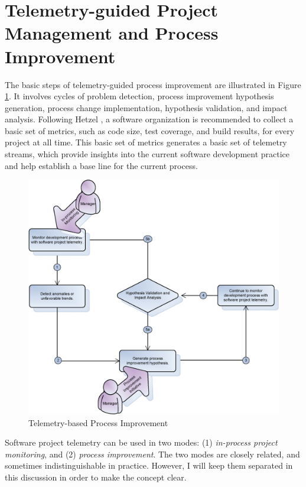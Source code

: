 \section{Telemetry-guided Project Management and Process Improvement} 
\label{Telemetry:Process}

The basic steps of telemetry-guided process improvement are illustrated in Figure \ref{fig:TelemetryBasedProcessImprovement}. It involves cycles of problem detection, process improvement hypothesis generation, process change implementation, hypothesis validation, and impact analysis.
Following Hetzel \cite{Hetzel:1993}, a software organization is recommended to collect a basic set of metrics, such as code size, test coverage, and build results, for every project at all time. This basic set of metrics generates a basic set of telemetry streams, which provide insights into the current software development practice and help establish a base line for the current process.

\begin{figure}[p]
  \includegraphics[width=1.00\textwidth]{figures/TelemetryProcess}
  \caption{Telemetry-based Process Improvement} 
  \label{fig:TelemetryBasedProcessImprovement}
\end{figure}


Software project telemetry can be used in two modes: (1) \textit{in-process project monitoring}, and (2) \textit{process improvement}. The two modes are closely related, and sometimes indistinguishable in practice. However, I will keep them separated in this discussion in order to make the concept clear. 

